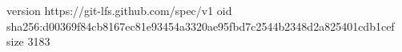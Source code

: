version https://git-lfs.github.com/spec/v1
oid sha256:d00369f84cb8167ec81e93454a3320ae95fbd7c2544b2348d2a825401cdb1cef
size 3183
